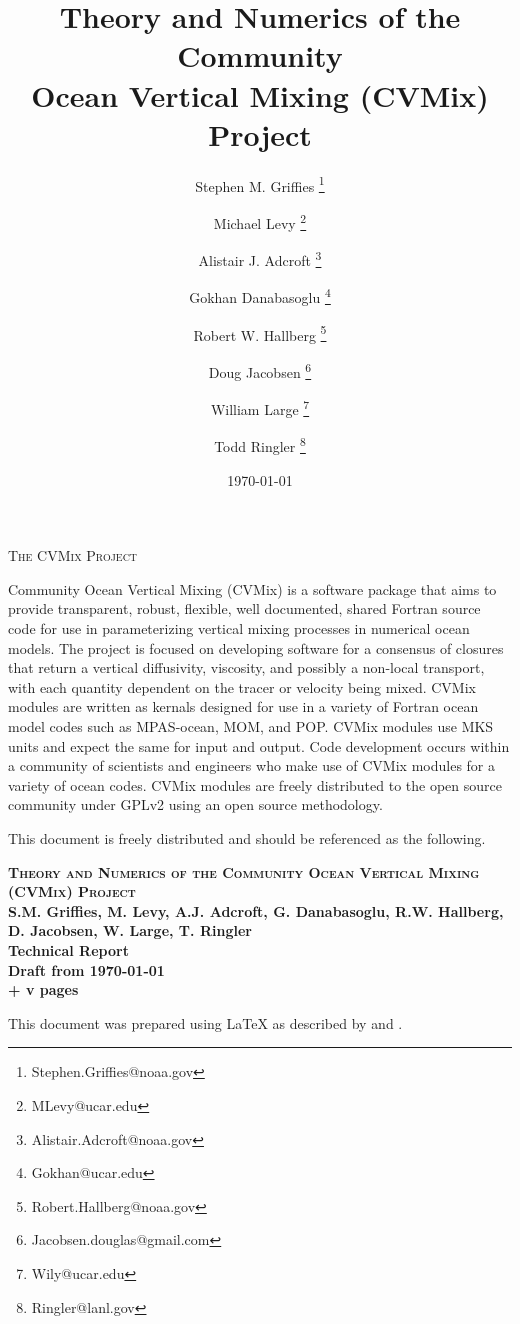 \documentclass[10pt]{book}
\title{\sc Theory and Numerics of the Community 
         \\ Ocean Vertical Mixing (CVMix) Project}
\date{\today}
\author[$\star$]{Stephen M. Grif\/f\/ies \thanks{Stephen.Griffies@noaa.gov}}
\affil[$\star$]{NOAA/Geophysical Fluid Dynamics Laboratory, Princeton USA}
\author[$\dagger$]{Michael Levy \thanks{MLevy@ucar.edu}}
\affil[$\dagger$]{National Center for Atmospheric Research, Boulder USA}
\author[$\star$]{Alistair J. Adcroft \thanks{Alistair.Adcroft@noaa.gov}}
\author[$\dagger$]{Gokhan Danabasoglu \thanks{Gokhan@ucar.edu}}
\author[$\star$]{Robert W. Hallberg \thanks{Robert.Hallberg@noaa.gov}}
\author[$\triangle$]{Doug Jacobsen \thanks{Jacobsen.douglas@gmail.com}}
\affil[$\triangle$]{Los Alamos National Laboratory, Los Alamos USA}
\author[$\dagger$]{William Large \thanks{Wily@ucar.edu}}
\author[$\triangle$]{Todd Ringler \thanks{Ringler@lanl.gov}}
\begin{document}
\maketitle 
\thispagestyle{empty}

\begin{center}
{\scshape \Large The CVMix Project} 
\end{center}

{\sc Community Ocean Vertical Mixing (CVMix)} is a software package
that aims to provide transparent, robust, flexible, well documented,
shared Fortran source code for use in parameterizing vertical mixing
processes in numerical ocean models.  The project is focused on
developing software for a consensus of closures that return a vertical
diffusivity, viscosity, and possibly a non-local transport, with each
quantity dependent on the tracer or velocity being mixed.  CVMix
modules are written as kernals designed for use in a variety of
Fortran ocean model codes such as MPAS-ocean, MOM, and POP.  CVMix
modules use MKS units and expect the same for input and output.  Code
development occurs within a community of scientists and engineers who
make use of CVMix modules for a variety of ocean codes.  CVMix modules
are freely distributed to the open source community under GPLv2 using
an open source methodology.

\vspace{2cm}

\noindent
This document is freely distributed and should be referenced as the
following. \vspace{.25cm}

\noindent
{\bf 
{\scshape{Theory and Numerics of the Community Ocean Vertical
    Mixing (CVMix) Project}}
\\
S.M. Grif\/f\/ies, M. Levy, A.J. Adcroft, G. Danabasoglu,
R.W. Hallberg,  D. Jacobsen, W. Large, T. Ringler
\\
Technical Report
\\
Draft from \today 
\\
\pageref{LastPage} + v pages\\
}
\vspace{.4cm}



\noindent
This document was prepared using \LaTeX \hspace{.1cm} as described by
\cite{Latex} and \cite{LatexCompanion}.
\end{document}
